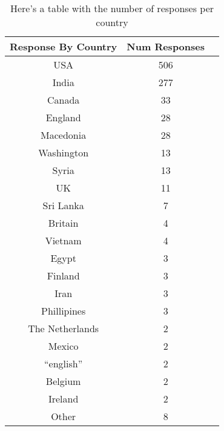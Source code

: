\begin{table}
\begin{center}

\begin{tabular}{|c|c|c|}
\hline 
Response By Country   &   Num Responses   \\ \hline
USA   &   506   \\ \hline
India   &   277   \\ \hline
Canada   &   33   \\ \hline
England   &   28   \\ \hline
Macedonia   &   28   \\ \hline
Washington   &   13   \\ \hline
Syria   &   13   \\ \hline
UK   &   11   \\ \hline
Sri Lanka   &   7   \\ \hline
Britain   &   4   \\ \hline
Vietnam   &   4   \\ \hline
Egypt   &   3   \\ \hline
Finland   &   3   \\ \hline
Iran   &   3   \\ \hline
Phillipines   &   3   \\ \hline
The Netherlands   &   2   \\ \hline
Mexico   &   2   \\ \hline
``english''   &   2   \\ \hline
Belgium   &   2   \\ \hline
Ireland   &   2   \\ \hline
Other   &   8   \\ \hline
\end{tabular}

\captionfonts
\caption[Countries and responses]{ Here's a table with the number of responses per country}
\label{table:countryTally}
\end{center}
\end{table}

